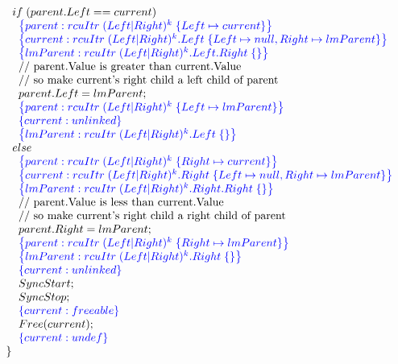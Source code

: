 \[\begin{array}{@{}l@{}}
            \;\;\;\;if\; (parent.Left == current)\\
                \;\;\;\;\;\;\specline{parent:rcuItr\; (Left|Right)^{k} \; \{ Left \mapsto current\} }\\
                \;\;\;\;\;\;\specline{current:rcuItr\; (Left|Right)^{k}.Left \; \{Left\mapsto null, Right\mapsto lmParent\} }\\
                \;\;\;\;\;\;\specline{lmParent:rcuItr\; (Left|Right)^{k}.Left.Right \; \{\} }\\
                \;\;\;\;\;\;\text{// parent.Value is greater than current.Value}\\
                \;\;\;\;\;\;\text{// so make current's right child a left child of parent}\\
                \;\;\;\;\;\;parent.Left = lmParent;\\
                \;\;\;\;\;\;\specline{parent:rcuItr\; (Left|Right)^{k} \; \{ Left \mapsto lmParent\} }\\
                \;\;\;\;\;\;\specline{current:unlinked }\\
                \;\;\;\;\;\;\specline{lmParent:rcuItr\; (Left|Right)^{k}.Left \; \{\} }\\                 
            \;\;\;\;else\\
                \;\;\;\;\;\;\specline{parent:rcuItr\; (Left|Right)^{k} \; \{ Right \mapsto current\} }\\
                \;\;\;\;\;\;\specline{current:rcuItr\; (Left|Right)^{k}.Right \; \{Left\mapsto null, Right\mapsto lmParent\} }\\
                \;\;\;\;\;\;\specline{lmParent:rcuItr\; (Left|Right)^{k}.Right.Right \; \{\} }\\
                \;\;\;\;\;\;\text{// parent.Value is less than current.Value}\\
                \;\;\;\;\;\;\text{// so make current's right child a right child of parent}\\
                \;\;\;\;\;\;parent.Right = lmParent;\\
                \;\;\;\;\;\;\specline{parent:rcuItr\; (Left|Right)^{k} \; \{ Right \mapsto lmParent\} }\\
                \;\;\;\;\;\;\specline{lmParent:rcuItr\; (Left|Right)^{k}.Right \; \{\} }\\
                \;\;\;\;\;\;\specline{current:unlinked  }\\
                \;\;\;\;\;\;SyncStart;\\
                \;\;\;\;\;\;SyncStop;\\
                \;\;\;\;\;\;\specline{current:freeable}\\
                \;\;\;\;\;\;Free(current);\\
                \;\;\;\;\;\;\specline{current:undef}\\
       
    \;\;\}\\
\end{array}
\]
